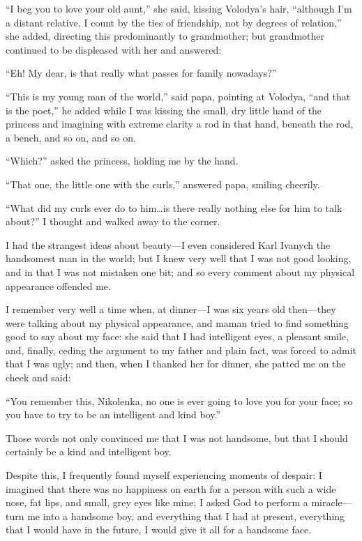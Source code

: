 ``I beg you to love your old aunt,'' she said, kissing Volodya's hair, ``although I'm a distant relative, I count by the ties of friendship, not by degrees of relation,'' she added, directing this predominantly to grandmother; but grandmother continued to be displeased with her and answered:

``Eh! My dear, is that really what passes for family nowadays?'' %

``This is my young man of the world,'' said papa, pointing at Volodya, ``and that is the poet,'' he added while I was kissing the small, dry little hand of the princess and imagining with extreme clarity a rod in that hand, beneath the rod, a bench, and so on, and so on. %

``Which?'' asked the princess, holding me by the hand. %

``That one, the little one with the curls,'' answered papa, smiling cheerily.

``What did my curls ever do to him\ldots{}is there really nothing else for him to talk about?'' I thought and walked away to the corner.

I had the strangest ideas about beauty---I even considered Karl Ivanych the handsomest man in the world; but I knew very well that I was not good looking, and in that I was not mistaken one bit; and so every comment about my physical appearance offended me.

I remember very well a time when, at dinner---I was six years old then---they were talking about my physical appearance, and maman tried to find something good to say about my face: she said that I had intelligent eyes, a pleasant smile, and, finally, ceding the argument to my father and plain fact, was forced to admit that I was ugly; and then, when I thanked her for dinner, she patted me on the cheek and said:

``You remember this, Nikolenka, no one is ever going to love you for your face; so you have to try to be an intelligent and kind boy.'' %

Those words not only convinced me that I was not handsome, but that I should certainly be a kind and intelligent boy.

Despite this, I frequently found myself experiencing moments of despair: I imagined that there was no happiness on earth for a person with such a wide nose, fat lips, and small, grey eyes like mine; I asked God to perform a miracle---turn me into a handsome boy, and everything that I had at present, everything that I would have in the future, I would give it all for a handsome face.

